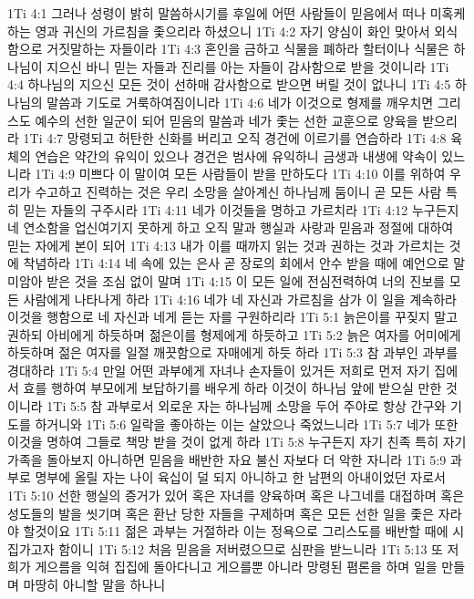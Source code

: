 1Ti 4:1  그러나 성령이 밝히 말씀하시기를 후일에 어떤 사람들이 믿음에서 떠나 미혹케 하는 영과 귀신의 가르침을 좇으리라 하셨으니
1Ti 4:2  자기 양심이 화인 맞아서 외식함으로 거짓말하는 자들이라
1Ti 4:3  혼인을 금하고 식물을 폐하라 할터이나 식물은 하나님이 지으신 바니 믿는 자들과 진리를 아는 자들이 감사함으로 받을 것이니라
1Ti 4:4  하나님의 지으신 모든 것이 선하매 감사함으로 받으면 버릴 것이 없나니
1Ti 4:5  하나님의 말씀과 기도로 거룩하여짐이니라
1Ti 4:6  네가 이것으로 형제를 깨우치면 그리스도 예수의 선한 일군이 되어 믿음의 말씀과 네가 좇는 선한 교훈으로 양육을 받으리라
1Ti 4:7  망령되고 허탄한 신화를 버리고 오직 경건에 이르기를 연습하라
1Ti 4:8  육체의 연습은 약간의 유익이 있으나 경건은 범사에 유익하니 금생과 내생에 약속이 있느니라
1Ti 4:9  미쁘다 이 말이여 모든 사람들이 받을 만하도다
1Ti 4:10  이를 위하여 우리가 수고하고 진력하는 것은 우리 소망을 살아계신 하나님께 둠이니 곧 모든 사람 특히 믿는 자들의 구주시라
1Ti 4:11  네가 이것들을 명하고 가르치라
1Ti 4:12  누구든지 네 연소함을 업신여기지 못하게 하고 오직 말과 행실과 사랑과 믿음과 정절에 대하여 믿는 자에게 본이 되어
1Ti 4:13  내가 이를 때까지 읽는 것과 권하는 것과 가르치는 것에 착념하라
1Ti 4:14  네 속에 있는 은사 곧 장로의 회에서 안수 받을 때에 예언으로 말미암아 받은 것을 조심 없이 말며
1Ti 4:15  이 모든 일에 전심전력하여 너의 진보를 모든 사람에게 나타나게 하라
1Ti 4:16  네가 네 자신과 가르침을 삼가 이 일을 계속하라 이것을 행함으로 네 자신과 네게 듣는 자를 구원하리라
1Ti 5:1  늙은이를 꾸짖지 말고 권하되 아비에게 하듯하며 젊은이를 형제에게 하듯하고
1Ti 5:2  늙은 여자를 어미에게 하듯하며 젊은 여자를 일절 깨끗함으로 자매에게 하듯 하라
1Ti 5:3  참 과부인 과부를 경대하라
1Ti 5:4  만일 어떤 과부에게 자녀나 손자들이 있거든 저희로 먼저 자기 집에서 효를 행하여 부모에게 보답하기를 배우게 하라 이것이 하나님 앞에 받으실 만한 것이니라
1Ti 5:5  참 과부로서 외로운 자는 하나님께 소망을 두어 주야로 항상 간구와 기도를 하거니와
1Ti 5:6  일락을 좋아하는 이는 살았으나 죽었느니라
1Ti 5:7  네가 또한 이것을 명하여 그들로 책망 받을 것이 없게 하라
1Ti 5:8  누구든지 자기 친족 특히 자기 가족을 돌아보지 아니하면 믿음을 배반한 자요 불신 자보다 더 악한 자니라
1Ti 5:9  과부로 명부에 올릴 자는 나이 육십이 덜 되지 아니하고 한 남편의 아내이었던 자로서
1Ti 5:10  선한 행실의 증거가 있어 혹은 자녀를 양육하며 혹은 나그네를 대접하며 혹은 성도들의 발을 씻기며 혹은 환난 당한 자들을 구제하며 혹은 모든 선한 일을 좇은 자라야 할것이요
1Ti 5:11  젊은 과부는 거절하라 이는 정욕으로 그리스도를 배반할 때에 시집가고자 함이니
1Ti 5:12  처음 믿음을 저버렸으므로 심판을 받느니라
1Ti 5:13  또 저희가 게으름을 익혀 집집에 돌아다니고 게으를뿐 아니라 망령된 폄론을 하며 일을 만들며 마땅히 아니할 말을 하나니

